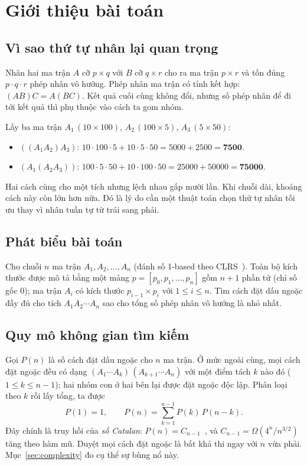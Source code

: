 \documentclass[12pt,a4paper]{article}
\begin{document}
\newpage
\fancyfoot[R]{}
\tableofcontents

\newpage
{}
\setcounter{page}{1}

\section{Giới thiệu bài toán}

\subsection{Vì sao thứ tự nhân lại quan trọng}
Nhân hai ma trận $A$ cỡ $p \times q$ với $B$ cỡ $q \times r$ cho ra ma trận $p \times r$ và tốn đúng $p \cdot q \cdot r$ phép nhân vô hướng. Phép nhân ma trận có tính kết hợp: $(AB)C = A(BC)$. Kết quả cuối cùng không đổi, nhưng số phép nhân để đi tới kết quả thì phụ thuộc vào cách ta gom nhóm.

Lấy ba ma trận $A_1\,(10 \times 100)$, $A_2\,(100 \times 5)$, $A_3\,(5 \times 50)$:
\begin{itemize}
  \item $((A_1 A_2) A_3)$: $10 \cdot 100 \cdot 5 + 10 \cdot 5 \cdot 50 = 5000 + 2500 = \mathbf{7500}$.
  \item $(A_1 (A_2 A_3))$: $100 \cdot 5 \cdot 50 + 10 \cdot 100 \cdot 50 = 25000 + 50000 = \mathbf{75000}$.
\end{itemize}
Hai cách cùng cho một tích nhưng lệch nhau gấp mười lần. Khi chuỗi dài, khoảng cách này còn lớn hơn nữa. Đó là lý do cần một thuật toán chọn thứ tự nhân tối ưu thay vì nhân tuần tự từ trái sang phải.

\subsection{Phát biểu bài toán}
Cho chuỗi $n$ ma trận $A_1, A_2, \ldots, A_n$ (đánh số 1-based theo CLRS~\cite{clrs}). Toàn bộ kích thước được mô tả bằng một mảng $p = [p_0, p_1, \ldots, p_n]$ gồm $n + 1$ phần tử (chỉ số gốc 0); ma trận $A_i$ có kích thước $p_{i-1} \times p_i$ với $1 \le i \le n$.
Tìm cách đặt dấu ngoặc đầy đủ cho tích $A_1 A_2 \cdots A_n$ sao cho tổng số phép nhân vô hướng là nhỏ nhất.

\subsection{Quy mô không gian tìm kiếm}
Gọi $P(n)$ là số cách đặt dấu ngoặc cho $n$ ma trận. Ở mức ngoài cùng, mọi cách đặt ngoặc đều có dạng $(A_1 \cdots A_k)\,(A_{k+1} \cdots A_n)$ với một điểm tách $k$ nào đó ($1 \le k \le n-1$); hai nhóm con ở hai bên lại được đặt ngoặc độc lập. Phân loại theo $k$ rồi lấy tổng, ta được
\[
P(1) = 1, \qquad P(n) = \sum_{k=1}^{n-1} P(k)\,P(n-k).
\]
Đây chính là truy hồi của \emph{số Catalan}: $P(n) = C_{n-1}$~\cite{clrs}, và $C_{n-1} = \Omega\!\left(4^n / n^{3/2}\right)$ tăng theo hàm mũ. Duyệt mọi cách đặt ngoặc là bất khả thi ngay với $n$ vừa phải. Mục~\ref{sec:complexity} đo cụ thể sự bùng nổ này.
\end{document}
